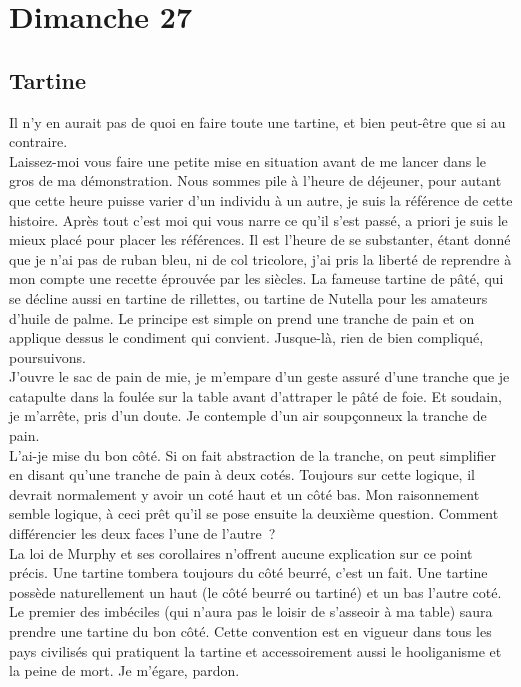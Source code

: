﻿\section*{Dimanche 27}
\subsection*{Tartine}
Il n’y en aurait pas de quoi en faire toute une tartine, et bien peut-être que si au contraire.\\

Laissez-moi vous faire une petite mise en situation avant de me lancer dans le gros de ma démonstration. Nous sommes pile à l’heure de déjeuner, pour autant que cette heure puisse varier d’un individu à un autre, je suis la référence de cette histoire. Après tout c’est moi qui vous narre ce qu’il s’est passé, a priori je suis le mieux placé pour placer les références. Il est l’heure de se substanter, étant donné que je n’ai pas de ruban bleu, ni de col tricolore, j’ai pris la liberté de reprendre à mon compte une recette éprouvée par les siècles. La fameuse tartine de pâté, qui se décline aussi en tartine de rillettes, ou tartine de Nutella pour les amateurs d’huile de palme. Le principe est simple on prend une tranche de pain et on applique dessus le condiment qui convient. Jusque-là, rien de bien compliqué, poursuivons.\\
J’ouvre le sac de pain de mie, je m’empare d’un geste assuré d’une tranche que je catapulte dans la foulée sur la table avant d’attraper le pâté de foie. Et soudain, je m’arrête, pris d’un doute. Je contemple d’un air soupçonneux la tranche de pain.\\

L’ai-je mise du bon côté. Si on fait abstraction de la tranche, on peut simplifier en disant qu’une tranche de pain à deux cotés. Toujours sur cette logique, il devrait normalement y avoir un coté haut et un côté bas. Mon raisonnement semble logique, à ceci prêt qu’il se pose ensuite la deuxième question. Comment différencier les deux faces l’une de l’autre ?\\

La loi de Murphy et ses corollaires n’offrent aucune explication sur ce point précis. Une tartine tombera toujours du côté beurré, c’est un fait. Une tartine possède naturellement un haut (le côté beurré ou tartiné) et un bas l’autre coté. Le premier des imbéciles (qui n’aura pas le loisir de s’asseoir à ma table) saura prendre une tartine du bon côté. Cette convention est en vigueur dans tous les pays civilisés qui pratiquent la tartine et accessoirement aussi le hooliganisme et la peine de mort. Je m’égare, pardon.\\

